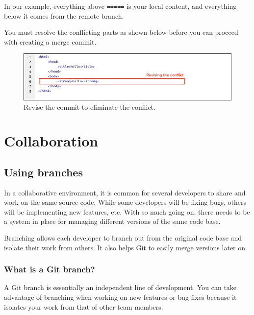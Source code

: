\documentclass[10pt,a4paper,english]{report}
\begin{document}
    In our example, everything above \verb"=====" is your local content, and everything below it comes from the remote branch.

    You must resolve the conflicting parts as shown below before you can proceed with creating a merge commit.

    \begin{figure}[ht]
    \begin{center}
    \includegraphics[scale=0.5]{images/syncing_repositories_006.png}
    \end{center}
    \caption{Revise the commit to eliminate the conflict.}
    \end{figure}

\part{Collaboration}

\chapter{Using branches}

    In a collaborative environment, it is common for several developers to share and work on the same source code. While some developers will be fixing bugs, others will be implementing new features, etc. With so much going on, there needs to be a system in place for managing different versions of the same code base.

    Branching allows each developer to branch out from the original code base and isolate their work from others. It also helps Git to easily merge versions later on.

    \section{What is a Git branch?}

    A Git branch is essentially an independent line of development. You can take advantage of branching when working on new features or bug fixes because it isolates your work from that of other team members.
\end{document}
